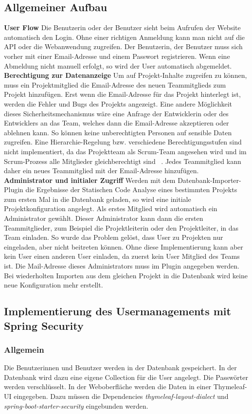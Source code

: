 \subsection{Allgemeiner Aufbau} 
\textbf{User Flow}
Die Benutzerin oder der Benutzer sieht beim Aufrufen der Website automatisch den Login. Ohne einer richtigen Anmeldung kann man nicht auf die API oder die Webanwendung zugreifen. Der Benutzerin, der Benutzer muss sich vorher mit einer Email-Adresse und einem Passwort registrieren. Wenn eine Abmeldung nicht manuell erfolgt, so wird der User automatisch abgemeldet.
\textbf{Berechtigung zur Datenanzeige}
Um auf Projekt-Inhalte zugreifen zu können, muss ein Projektmitglied die Email-Adresse des neuen Teammitglieds zum Projekt hinzufügen. Erst wenn die Email-Adresse für das Projekt hinterlegt ist, werden die Fehler und Bugs des Projekts angezeigt. Eine andere Möglichkeit dieses Sicherheitsmechanismus wäre eine Anfrage der Entwicklerin oder des Entwicklers an das Team, welches dann die Email-Adresse akzeptieren oder ablehnen kann. So können keine unberechtigten Personen auf sensible Daten zugreifen. Eine Hierarchie-Regelung bzw. verschiedene Berechtigungsstufen sind nicht implementiert, da das Projektteam als Scrum-Team angesehen wird und im Scrum-Prozess alle Mitglieder gleichberechtigt sind ~\parencite{scrumprozess}. Jedes Teammitglied kann daher ein neues Teammitglied mit der Email-Adresse hinzufügen.
\textbf{Administrator und initialer Zugriff}
Werden mit dem Datenbank-Importer-Plugin die Ergebnisse der Statischen Code Analyse eines bestimmten Projekts zum ersten Mal in die Datenbank geladen, so wird eine initiale Projektkonfiguration angelegt. Als erstes Mitglied wird automatisch ein Administrator gewählt. Dieser Administrator kann dann die ersten Teammitglieder, zum Beispiel die Projektleiterin oder den Projektleiter, in das Team einladen. So wurde das Problem gelöst, dass User zu Projekten nur eingeladen, aber nicht beitreten können. Ohne diese Implementierung kann aber kein User einen anderen User einladen, da zuerst kein User Mitglied des Teams ist. Die Mail-Adresse dieses Administrators muss im Plugin angegeben werden. Bei wiederholten Importen aus dem gleichen Projekt in die Datenbank wird keine neue Konfiguration mehr erstellt.

\subsection{Implementierung des Usermanagements mit Spring Security}
\subsubsection{Allgemein}
Die Benutzerinnen und Benutzer werden in der Datenbank gespeichert. In der Datenbank wird dazu eine eigene Collection für die User angelegt. Die Passwörter werden verschlüsselt. In der Weboberfläche werden die Daten in einer Thymeleaf-UI eingegeben. Dazu müssen die Dependencies \textit{thymeleaf-layout-dialect} und \textit{spring-boot-starter-security} eingebunden werden. 
